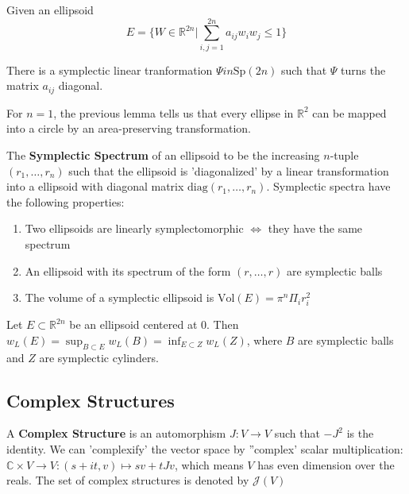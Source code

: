 \begin{lem}

Given an ellipsoid
\[E = \{W \in \mathbb{R}^{2n} \vert \sum_{i,j=1}^{2n} a_{ij} w_i w_j \leq 1 \}\]

There is a symplectic linear tranformation $\Psi in \mathrm{Sp}(2n)$ such that $\Psi$ turns the matrix $a_{ij}$ diagonal.

\end{lem}

\begin{rmk}

For $n=1$, the previous lemma tells us that every ellipse in $\mathbb{R}^2$ can be mapped into a circle by an area-preserving transformation. 

\end{rmk}

\begin{defn}

The \textbf{Symplectic Spectrum} of an ellipsoid to be the increasing $n$-tuple $(r_1, \ldots, r_n)$ such that the ellipsoid is 'diagonalized' by a linear transformation into a ellipsoid with diagonal matrix $\mathrm{diag}(r_1, \ldots, r_n)$. Symplectic spectra have the following properties:

\begin{enumerate}
    \item Two ellipsoids are linearly symplectomorphic $\iff$ they have the same spectrum
    \item An ellipsoid with its spectrum of the form $(r,\ldots,r)$ are symplectic balls
    \item The volume of a symplectic ellipsoid is $\mathrm{Vol}(E) = \pi^n \Pi_i r_i^2$
\end{enumerate}

\end{defn}


\begin{thm}

Let $E \subset \mathbb{R}^{2n}$ be an ellipsoid centered at 0. Then $ w_L(E) = \sup_{B\subset E} w_L(B) = \inf_{E \subset Z} w_L(Z)$, where $B$ are symplectic balls and $Z$ are symplectic cylinders.

\end{thm}

\subsection{Complex Structures}

\begin{defn}

A \textbf{Complex Structure} is an automorphism $J: V \to V$ such that $-J^2$ is the identity. We can 'complexify' the vector space by ''complex' scalar multiplication: $\mathbb{C}\times V \to V: (s+i t, v) \mapsto sv + tJv$, which means $V$ has even dimension over the reals. The set of complex structures is denoted by $\mathcal{J}(V)$

\end{defn}

